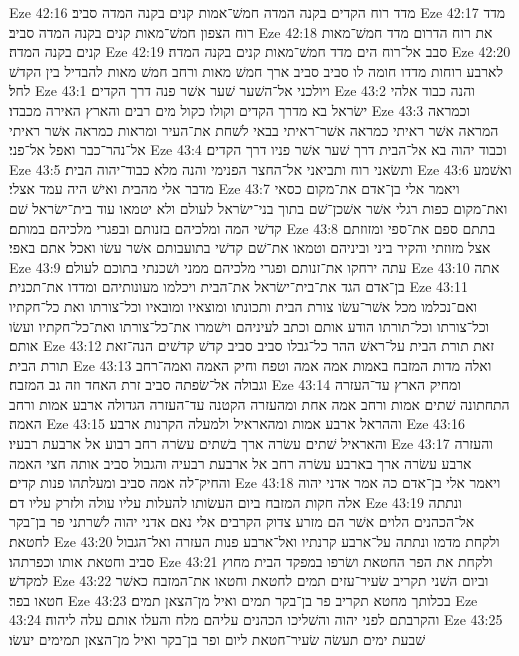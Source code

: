 Eze 42:16  מדד רוח הקדים בקנה המדה חמשׁ־אמות קנים בקנה המדה סביב׃
Eze 42:17  מדד רוח הצפון חמשׁ־מאות קנים בקנה המדה סביב׃
Eze 42:18  את רוח הדרום מדד חמשׁ־מאות קנים בקנה המדה׃
Eze 42:19  סבב אל־רוח הים מדד חמשׁ־מאות קנים בקנה המדה׃
Eze 42:20  לארבע רוחות מדדו חומה לו סביב סביב ארך חמשׁ מאות ורחב חמשׁ מאות להבדיל בין הקדשׁ לחל׃
Eze 43:1  ויולכני אל־השׁער שׁער אשׁר פנה דרך הקדים׃
Eze 43:2  והנה כבוד אלהי ישׂראל בא מדרך הקדים וקולו כקול מים רבים והארץ האירה מכבדו׃
Eze 43:3  וכמראה המראה אשׁר ראיתי כמראה אשׁר־ראיתי בבאי לשׁחת את־העיר ומראות כמראה אשׁר ראיתי אל־נהר־כבר ואפל אל־פני׃
Eze 43:4  וכבוד יהוה בא אל־הבית דרך שׁער אשׁר פניו דרך הקדים׃
Eze 43:5  ותשׂאני רוח ותביאני אל־החצר הפנימי והנה מלא כבוד־יהוה הבית׃
Eze 43:6  ואשׁמע מדבר אלי מהבית ואישׁ היה עמד אצלי׃
Eze 43:7  ויאמר אלי בן־אדם את־מקום כסאי ואת־מקום כפות רגלי אשׁר אשׁכן־שׁם בתוך בני־ישׂראל לעולם ולא יטמאו עוד בית־ישׂראל שׁם קדשׁי המה ומלכיהם בזנותם ובפגרי מלכיהם במותם׃
Eze 43:8  בתתם ספם את־ספי ומזוזתם אצל מזוזתי והקיר ביני וביניהם וטמאו את־שׁם קדשׁי בתועבותם אשׁר עשׂו ואכל אתם באפי׃
Eze 43:9  עתה ירחקו את־זנותם ופגרי מלכיהם ממני ושׁכנתי בתוכם לעולם׃
Eze 43:10  אתה בן־אדם הגד את־בית־ישׂראל את־הבית ויכלמו מעונותיהם ומדדו את־תכנית׃
Eze 43:11  ואם־נכלמו מכל אשׁר־עשׂו צורת הבית ותכונתו ומוצאיו ומובאיו וכל־צורתו ואת כל־חקתיו וכל־צורתו וכל־תורתו הודע אותם וכתב לעיניהם וישׁמרו את־כל־צורתו ואת־כל־חקתיו ועשׂו אותם׃
Eze 43:12  זאת תורת הבית על־ראשׁ ההר כל־גבלו סביב סביב קדשׁ קדשׁים הנה־זאת תורת הבית׃
Eze 43:13  ואלה מדות המזבח באמות אמה אמה וטפח וחיק האמה ואמה־רחב וגבולה אל־שׂפתה סביב זרת האחד וזה גב המזבח׃
Eze 43:14  ומחיק הארץ עד־העזרה התחתונה שׁתים אמות ורחב אמה אחת ומהעזרה הקטנה עד־העזרה הגדולה ארבע אמות ורחב האמה׃
Eze 43:15  וההראל ארבע אמות ומהאראיל ולמעלה הקרנות ארבע׃
Eze 43:16  והאראיל שׁתים עשׂרה ארך בשׁתים עשׂרה רחב רבוע אל ארבעת רבעיו׃
Eze 43:17  והעזרה ארבע עשׂרה ארך בארבע עשׂרה רחב אל ארבעת רבעיה והגבול סביב אותה חצי האמה והחיק־לה אמה סביב ומעלתהו פנות קדים׃
Eze 43:18  ויאמר אלי בן־אדם כה אמר אדני יהוה אלה חקות המזבח ביום העשׂותו להעלות עליו עולה ולזרק עליו דם׃
Eze 43:19  ונתתה אל־הכהנים הלוים אשׁר הם מזרע צדוק הקרבים אלי נאם אדני יהוה לשׁרתני פר בן־בקר לחטאת׃
Eze 43:20  ולקחת מדמו ונתתה על־ארבע קרנתיו ואל־ארבע פנות העזרה ואל־הגבול סביב וחטאת אותו וכפרתהו׃
Eze 43:21  ולקחת את הפר החטאת ושׂרפו במפקד הבית מחוץ למקדשׁ׃
Eze 43:22  וביום השׁני תקריב שׂעיר־עזים תמים לחטאת וחטאו את־המזבח כאשׁר חטאו בפר׃
Eze 43:23  בכלותך מחטא תקריב פר בן־בקר תמים ואיל מן־הצאן תמים׃
Eze 43:24  והקרבתם לפני יהוה והשׁליכו הכהנים עליהם מלח והעלו אותם עלה ליהוה׃
Eze 43:25  שׁבעת ימים תעשׂה שׂעיר־חטאת ליום ופר בן־בקר ואיל מן־הצאן תמימים יעשׂו׃
